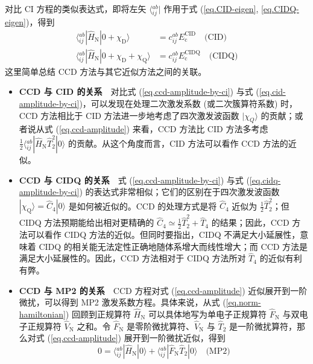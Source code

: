 对比 CI 方程的类似表达式，即将左矢 $\langle {}_{ij}^{ab} |$ 作用于式 (\ref{eq.CID-eigen}, \ref{eq.CIDQ-eigen})，得到
\begin{align}
  \label{eq.cid-amplitude-by-ci}
  \langle {}_{ij}^{ab} | \hat H_\mathrm{N} | 0 + \chi_\mathrm{D} \rangle &= c_{ij}^{ab} E_\mathrm{c}^\mathrm{CID} \quad \text{(CID)} \\
  \label{eq.cidq-amplitude-by-ci}
  \langle {}_{ij}^{ab} | \hat H_\mathrm{N} | 0 + \chi_\mathrm{D} + \chi_\mathrm{Q} \rangle &= c_{ij}^{ab} E_\mathrm{c}^\mathrm{CIDQ} \quad \text{(CIDQ)}
\end{align}
这里简单总结 CCD 方法与其它近似方法之间的关联。
\begin{itemize}[nosep]
  \item \textbf{CCD 与 CID 的关系}　对比式 (\ref{eq.ccd-amplitude-by-ci}) 与式 (\ref{eq.cid-amplitude-by-ci})，可以发现在处理二次激发系数 (或二次簇算符系数) 时，CCD 方法相比于 CID 方法进一步地考虑了四次激发波函数 $| \chi_Q \rangle$ 的贡献；或者说从式 (\ref{eq.ccd-amplitude}) 来看，CCD 方法比 CID 方法多考虑 $\frac{1}{2} \langle {}_{ij}^{ab} | \hat H_\mathrm{N} \hat T_2^2 | 0 \rangle$ 的贡献。从这个角度而言，CID 方法可以看作 CCD 方法的近似。
  \item \textbf{CCD 与 CIDQ 的关系}　式 (\ref{eq.ccd-amplitude-by-ci}) 与式 (\ref{eq.cidq-amplitude-by-ci}) 的表达式非常相似；它们的区别在于四次激发波函数 $| \chi_\mathrm{Q} \rangle = \hat C_4 | 0 \rangle$ 是如何被近似的。CCD 的处理方式是将 $\hat C_4$ 近似为 $\frac{1}{2} \hat T_2^2$；但 CIDQ 方法预期能给出相对更精确的 $\hat C_4 \simeq \frac{1}{2} \hat T_2^2 + \hat T_4$ 的结果；因此，CCD 方法可以看作 CIDQ 方法的近似。但同时要指出，CIDQ 不满足大小延展性，意味着 CIDQ 的相关能无法定性正确地随体系增大而线性增大；而 CCD 方法是满足大小延展性的。因此，CCD 方法相对于 CIDQ 方法所对 $\hat T_4$ 的近似有利有弊。
  \item \textbf{CCD 与 MP2 的关系}　CCD 方程对式 (\ref{eq.ccd-amplitude}) 近似展开到一阶微扰，可以得到 MP2 激发系数方程。具体来说，从式 (\ref{eq.norm-hamiltonian}) 回顾到正规算符 $\hat H_\mathrm{N}$ 可以具体地写为单电子正规算符 $\hat F_\mathrm{N}$ 与双电子正规算符 $\hat V_\mathrm{N}$ 之和。令 $\hat F_\mathrm{N}$ 是零阶微扰算符、$\hat V_\mathrm{N}$ 与 $\hat T_2$ 是一阶微扰算符，那么对式 (\ref{eq.ccd-amplitude}) 展开到一阶微扰近似，得到
  \begin{equation}
    \label{eq.mp2-amplitude}
    0 = \langle {}_{ij}^{ab} | \hat H_\mathrm{N} | 0 \rangle + \langle {}_{ij}^{ab} | \hat F_\mathrm{N} \hat T_2 | 0 \rangle \quad \text{(MP2)}
  \end{equation}

\end{itemize}
